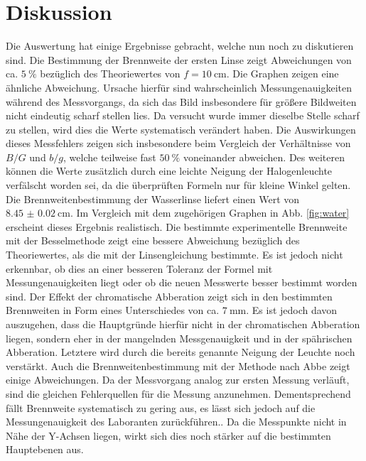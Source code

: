 
\section{Diskussion}
\label{sec:Diskussion}
Die Auswertung hat einige Ergebnisse gebracht, welche nun noch zu diskutieren sind.
Die Bestimmung der Brennweite der ersten Linse zeigt Abweichungen von
 ca. $\SI{5}{\percent}$ bezüglich des Theoriewertes von $f = \SI{10}{\centi\meter}$.
  Die Graphen zeigen eine ähnliche Abweichung. Ursache hierfür sind wahrscheinlich
   Messungenauigkeiten während des Messvorgangs, da sich das Bild insbesondere für
   größere Bildweiten nicht eindeutig scharf stellen lies. Da versucht wurde immer dieselbe Stelle
    scharf zu stellen, wird dies die Werte systematisch verändert haben. Die Auswirkungen dieses Messfehlers
   zeigen sich insbesondere beim Vergleich der Verhältnisse von $B/G$ und $b/g$,
    welche teilweise fast $\SI{50}{\percent}$ voneinander abweichen. Des weiteren können
     die Werte zusätzlich durch eine leichte Neigung der Halogenleuchte verfälscht worden sei,
     da die überprüften Formeln nur für kleine Winkel gelten. Die
      Brennweitenbestimmung der Wasserlinse liefert einen Wert von $\SI{8.45(2)}{\centi\meter}$.
      Im Vergleich mit dem zugehörigen Graphen in Abb. \ref{fig:water} erscheint dieses Ergebnis realistisch.
       Die bestimmte experimentelle Brennweite mit der Besselmethode zeigt eine
        bessere Abweichung bezüglich des Theoriewertes, als die mit der Linsengleichung bestimmte.
        Es ist jedoch nicht erkennbar, ob dies an einer besseren Toleranz der Formel mit
        Messungenauigkeiten liegt oder ob die neuen Messwerte besser bestimmt worden sind.
         Der Effekt der chromatische Abberation zeigt sich in den bestimmten
         Brennweiten in Form eines Unterschiedes von ca. $\SI{7}{\milli\meter}$. Es
          ist jedoch davon auszugehen, dass die Hauptgründe hierfür nicht in der
           chromatischen Abberation liegen, sondern eher in der mangelnden
            Messgenauigkeit und in der spährischen Abberation. Letztere wird durch
            die bereits genannte Neigung der Leuchte noch verstärkt. Auch die
            Brennweitenbestimmung mit der Methode nach Abbe zeigt einige Abweichungen.
            Da der Messvorgang analog zur ersten Messung verläuft, sind die
            gleichen Fehlerquellen für die Messung anzunehmen. Dementsprechend
            fällt Brennweite systematisch zu gering aus, es lässt sich jedoch auf die Messungenauigkeit des Laboranten zurückführen..
            Da die Messpunkte
             nicht in Nähe der Y-Achsen liegen, wirkt sich dies noch
             stärker auf die bestimmten Hauptebenen aus.
